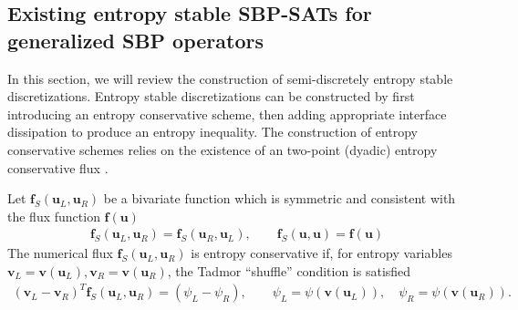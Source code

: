 \documentclass[review,onefignum,onetabnum,final]{siamart171218}
\newcommand{\pd}[2]{\frac{\partial#1}{\partial#2}}
\newcommand{\LRp}[1]{\left( #1 \right)}
\newcommand{\LRl}[1]{\left. #1 \right|}
\newcommand{\diag}[1]{{\rm diag}\LRp{#1}}
\begin{document}
%


\subsection{Existing entropy stable SBP-SATs for generalized SBP operators}
\label{sec:gsbpsat}

In this section, we will review the construction of semi-discretely entropy stable discretizations.  Entropy stable discretizations can be constructed by first introducing an entropy conservative scheme, then adding appropriate interface dissipation to produce an entropy inequality.  The construction of entropy conservative schemes relies on the existence of an two-point (dyadic) entropy conservative flux \cite{tadmor1987numerical}.  
\begin{definition}
\label{def:tadmor}
Let $\bm{f}_S(\bm{u}_L,\bm{u}_R)$ be a bivariate function which is symmetric and consistent with the flux function $\bm{f}(\bm{u})$
\begin{align*}
\bm{f}_S(\bm{u}_L,\bm{u}_R) = \bm{f}_S(\bm{u}_R,\bm{u}_L), \qquad \bm{f}_S(\bm{u},\bm{u}) = \bm{f}(\bm{u})
\end{align*}
The numerical flux $\bm{f}_S(\bm{u}_L, \bm{u}_R)$ is entropy conservative if, for entropy variables $\bm{v}_L = \bm{v}(\bm{u}_L), \bm{v}_R = \bm{v}(\bm{u}_R)$, the Tadmor ``shuffle'' condition is satisfied
\begin{align*}
\LRp{\bm{v}_L - \bm{v}_R}^T \bm{f}_S(\bm{u}_L,\bm{u}_R) = (\psi_L - \psi_R), \qquad \psi_L = \psi(\bm{v}(\bm{u}_L)), \quad \psi_R = \psi(\bm{v}(\bm{u}_R)).  
\end{align*}
\end{definition}
\end{document}
